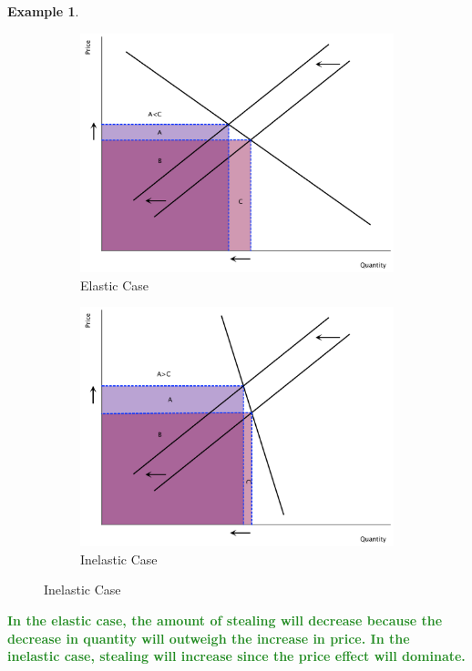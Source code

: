\documentclass[11pt]{article}\usepackage[]{graphicx}\usepackage[]{color}
\theoremstyle{definition}
\newtheorem{exmp}{Example}[section]
\newcommand{\ddp}[1]{{\textbf{\textcolor{ForestGreen}{#1}}}}
\begin{document}
\begin{exmp}
\begin{enumerate}
				\begin{figure}[H]
					\centering
					\caption{Example 5.10.2}
					\begin{subfigure}{.5\textwidth}
						\includegraphics[scale=.3]{plot31.pdf}
						\caption{Elastic Case}
					\end{subfigure}%
					\begin{subfigure}{.5\textwidth}
						\centering
						\includegraphics[scale=.3]{plot32.pdf}
						\caption{Inelastic Case}
					\end{subfigure}
				\end{figure}
				
				\ddp{In the elastic case, the amount of stealing will decrease because the decrease in quantity will outweigh the increase in price. In the inelastic case, stealing will increase since the price effect will dominate.}
			

\end{enumerate}
\end{exmp}
\end{document}
